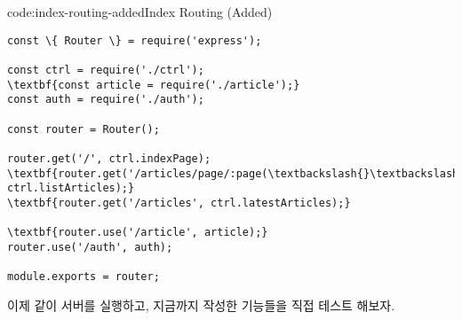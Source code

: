 \begin{codeenv}{code:index-routing-added}{Index Routing (Added)}
\begin{Verbatim}[commandchars=\\\{\}]
const \{ Router \} = require('express');

const ctrl = require('./ctrl');
\textbf{const article = require('./article');}
const auth = require('./auth');

const router = Router();

router.get('/', ctrl.indexPage);
\textbf{router.get('/articles/page/:page(\textbackslash{}\textbackslash{}d+)', ctrl.listArticles);}
\textbf{router.get('/articles', ctrl.latestArticles);}

\textbf{router.use('/article', article);}
router.use('/auth', auth);

module.exports = router;
\end{Verbatim}
\end{codeenv}

이제 \와 같이 서버를 실행하고, 지금까지 작성한 기능들을 직접 테스트 해보자.
